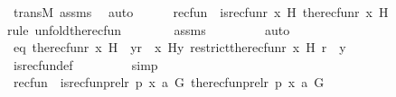\begin{isabellebody}
\ transM\ assms{}\ \isamarkupfalse%
\ auto\isanewline
\isanewline
\ \ \ \ \isamarkupfalse%
\ recfun\ {\isacharcolon}{\kern0pt}\ {\isachardoublequoteopen}is{\isacharunderscore}{\kern0pt}recfun{\isacharparenleft}{\kern0pt}r{\isacharcomma}{\kern0pt}\ x{\isacharcomma}{\kern0pt}\ H{\isacharcomma}{\kern0pt}\ the{\isacharunderscore}{\kern0pt}recfun{\isacharparenleft}{\kern0pt}r{\isacharcomma}{\kern0pt}\ x{\isacharcomma}{\kern0pt}\ H{\isacharparenright}{\kern0pt}{\isacharparenright}{\kern0pt}{\isachardoublequoteclose}\ \isanewline
\ \ \ \ \ \ \isamarkupfalse%
{\isacharparenleft}{\kern0pt}rule\ unfold{\isacharunderscore}{\kern0pt}the{\isacharunderscore}{\kern0pt}recfun{\isacharparenright}{\kern0pt}\isanewline
\ \ \ \ \ \ \isamarkupfalse%
\ assms\ \isanewline
\ \ \ \ \ \ \isamarkupfalse%
\ auto\ \isanewline
\ \ \ \ \isamarkupfalse%
\ \isamarkupfalse%
\ eq{}{\isacharcolon}{\kern0pt}\ {\isachardoublequoteopen}the{\isacharunderscore}{\kern0pt}recfun{\isacharparenleft}{\kern0pt}r{\isacharcomma}{\kern0pt}\ x{\isacharcomma}{\kern0pt}\ H{\isacharparenright}{\kern0pt}\ {\isacharequal}{\kern0pt}\ {\isacharparenleft}{\kern0pt}{\isasymlambda}y{\isasymin}r\ {\isacharminus}{\kern0pt}{\isacharbackquote}{\kern0pt}{\isacharbackquote}{\kern0pt}\ {\isacharbraceleft}{\kern0pt}x{\isacharbraceright}{\kern0pt}{\isachardot}{\kern0pt}\ H{\isacharparenleft}{\kern0pt}y{\isacharcomma}{\kern0pt}\ restrict{\isacharparenleft}{\kern0pt}the{\isacharunderscore}{\kern0pt}recfun{\isacharparenleft}{\kern0pt}r{\isacharcomma}{\kern0pt}\ x{\isacharcomma}{\kern0pt}\ H{\isacharparenright}{\kern0pt}{\isacharcomma}{\kern0pt}\ r\ {\isacharminus}{\kern0pt}{\isacharbackquote}{\kern0pt}{\isacharbackquote}{\kern0pt}\ {\isacharbraceleft}{\kern0pt}y{\isacharbraceright}{\kern0pt}{\isacharparenright}{\kern0pt}{\isacharparenright}{\kern0pt}{\isacharparenright}{\kern0pt}{\isachardoublequoteclose}\ \isanewline
\ \ \ \ \ \ \isamarkupfalse%
\ is{\isacharunderscore}{\kern0pt}recfun{\isacharunderscore}{\kern0pt}def\ \isanewline
\ \ \ \ \ \ \isamarkupfalse%
\ simp\isanewline
\isanewline
\ \ \ \ \isamarkupfalse%
\ recfun{}\ {\isacharcolon}{\kern0pt}\ {\isachardoublequoteopen}is{\isacharunderscore}{\kern0pt}recfun{\isacharparenleft}{\kern0pt}prel{\isacharparenleft}{\kern0pt}r{\isacharcomma}{\kern0pt}\ p{\isacharparenright}{\kern0pt}{\isacharcomma}{\kern0pt}\ {\isacharless}{\kern0pt}x{\isacharcomma}{\kern0pt}\ a{\isachargreater}{\kern0pt}{\isacharcomma}{\kern0pt}\ G{\isacharcomma}{\kern0pt}\ the{\isacharunderscore}{\kern0pt}recfun{\isacharparenleft}{\kern0pt}prel{\isacharparenleft}{\kern0pt}r{\isacharcomma}{\kern0pt}\ p{\isacharparenright}{\kern0pt}{\isacharcomma}{\kern0pt}\ {\isacharless}{\kern0pt}x{\isacharcomma}{\kern0pt}\ a{\isachargreater}{\kern0pt}{\isacharcomma}{\kern0pt}\ G{\isacharparenright}{\kern0pt}{\isacharparenright}{\kern0pt}{\isachardoublequoteclose}\ \isanewline

\end{isabellebody}
